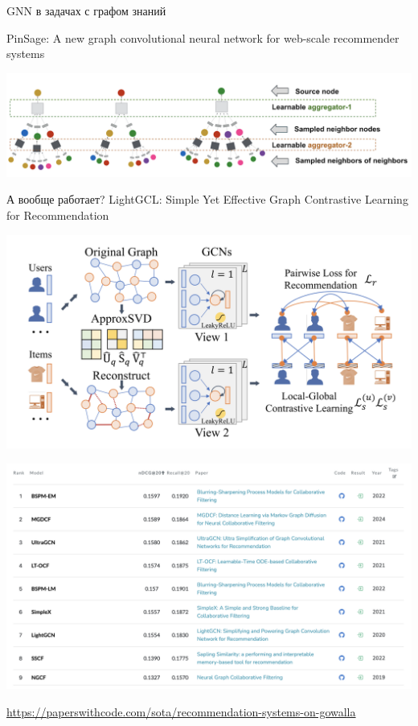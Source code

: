 \documentclass[11pt,aspectratio=169,handout]{beamer}
\begin{document}
\begin{frame}{GNN в задачах с графом знаний}

PinSage: A new graph convolutional neural network for web-scale recommender systems \cite{PINSAGE}

\begin{center}
\includegraphics[scale=0.3]{images/pinnersage.png}
\end{center}

\end{frame}

\begin{frame}{А вообще работает?}
LightGCL: Simple Yet Effective Graph Contrastive Learning for Recommendation
 \cite{LIGHTGCL}
 
\begin{center}
\includegraphics[scale=0.3]{images/lightgcl.png}
\end{center}

\end{frame}

\begin{frame}
 
\begin{center}
\includegraphics[scale=0.3]{images/pwc.png}
\end{center}

\url{https://paperswithcode.com/sota/recommendation-systems-on-gowalla}

\end{frame}
\end{document}
